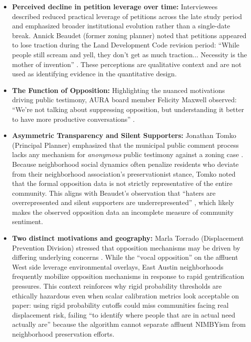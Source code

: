 \documentclass[11pt, letterpaper]{article}
\begin{document}
\begin{itemize}
    \item \textbf{Perceived decline in petition leverage over time:} Interviewees described reduced practical leverage of petitions across the late study period and emphasized broader institutional evolution rather than a single-date break. Annick Beaudet (former zoning planner) noted that petitions appeared to lose traction during the Land Development Code revision period: ``While people still scream and yell, they don't get as much traction... Necessity is the mother of invention'' \cite{interview_beaudet2025,cityaustin2017codenext}. These perceptions are qualitative context and are not used as identifying evidence in the quantitative design.

    \item \textbf{The Function of Opposition:} Highlighting the nuanced motivations driving public testimony, AURA board member Felicity Maxwell observed: ``We're not talking about suppressing opposition, but understanding it better to have more productive conversations'' \cite{interview_maxwell2026}.
    \item \textbf{Asymmetric Transparency and Silent Supporters:} Jonathan Tomko (Principal Planner) emphasized that the municipal public comment process lacks any mechanism for \textit{anonymous} public testimony against a zoning case \cite{interview_tomko2026}. Because neighborhood social dynamics often penalize residents who deviate from their neighborhood association's preservationist stance, Tomko noted that the formal opposition data is not strictly representative of the entire community. This aligns with Beaudet's observation that ``haters are overrepresented and silent supporters are underrepresented'' \cite{interview_beaudet2025}, which likely makes the observed opposition data an incomplete measure of community sentiment.
    \item \textbf{Two distinct motivations and geography:} Marla Torrado (Displacement Prevention Division) stressed that opposition mechanisms may be driven by differing underlying concerns \cite{interview_marla2025}. While the ``vocal opposition'' on the affluent West side leverage environmental overlays, East Austin neighborhoods frequently mobilize opposition mechanisms in response to rapid gentrification pressures. This context reinforces why rigid probability thresholds are ethically hazardous even when scalar calibration metrics look acceptable on paper: using rigid probability cutoffs could miss communities facing real displacement risk, failing ``to identify where people that are in actual need actually are'' because the algorithm cannot separate affluent NIMBYism from neighborhood preservation efforts.
\end{itemize}
\end{document}
